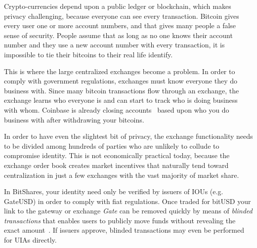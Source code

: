 Crypto-currencies depend upon a public ledger or blockchain, which makes
privacy challenging, because everyone can see every transaction. Bitcoin gives
every user one or more account numbers, and that gives many people a false
sense of security. People assume that as long as no one knows their account
number and they use a new account number with every transaction, it is
impossible to tie their bitcoins to their real life identify.

This is where the large centralized exchanges become a problem. In order to
comply with government regulations, exchanges must know everyone they do
business with. Since many bitcoin transactions flow through an exchange, the
exchange learns who everyone is and can start to track who is doing business
with whom. Coinbase is already closing accounts~\cite{coinbase:privacy} based
upon who you do business with after withdrawing your bitcoins.

In order to have even the slightest bit of privacy, the exchange functionality
needs to be divided among hundreds of parties who are unlikely to collude to
compromise identity. This is not economically practical today, because the
exchange order book creates market incentives that naturally tend toward
centralization in just a few exchanges with the vast majority of market share.

In BitShares, your identity need only be verified by issuers of IOUs (e.g.
GateUSD) in order to comply with fiat regulations. Once traded for bitUSD your
link to the gateway or exchange \emph{Gate} can be removed quickly by means of
\emph{blinded transactions} that enables users to publicly move funds without
revealing the exact amount~\cite{bts:general,blindSigPaper}. If issuers
approve, blinded transactions may even be performed for UIAs directly.
